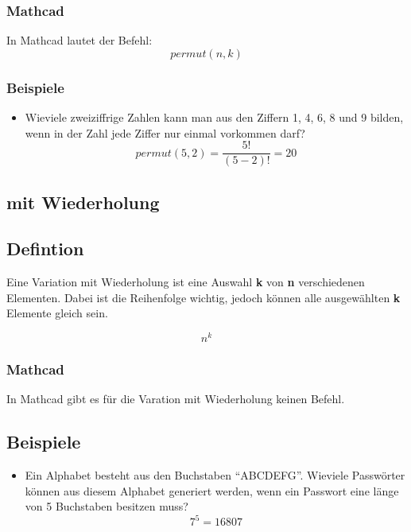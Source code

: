 \documentclass[a4paper,10pt]{article}
\begin{document}
\subsubsection{Mathcad}
In Mathcad lautet der Befehl:
\begin{equation}
  \label{eq:7}
  permut(n, k)
\end{equation}

\subsubsection{Beispiele}
\begin{itemize}
\item {
    Wieviele zweiziffrige Zahlen kann man aus den Ziffern 1, 4, 6, 8
    und 9 bilden, wenn in der Zahl jede Ziffer nur einmal vorkommen
    darf?
    \begin{equation}
      \label{eq:8}
      permut(5, 2) = \frac{5!}{(5 - 2)!} = 20
    \end{equation}
  }
\end{itemize}

\subsection{mit Wiederholung}
\subsection{Defintion}
Eine Variation mit Wiederholung ist eine Auswahl \textbf{k} von \textbf{n}
verschiedenen Elementen. Dabei ist die Reihenfolge wichtig, jedoch
können alle ausgewählten \textbf{k} Elemente gleich sein.

\begin{equation}
  \label{eq:11}
  n^k
\end{equation}

\subsubsection{Mathcad}
In Mathcad gibt es für die Varation mit Wiederholung keinen Befehl.

\subsection{Beispiele}
\begin{itemize}
\item {
    Ein Alphabet besteht aus den Buchstaben ``ABCDEFG''. Wieviele
    Passwörter können aus diesem Alphabet generiert werden, wenn ein
    Passwort eine länge von 5 Buchstaben besitzen muss?
    \begin{equation}
      \label{eq:12}
      7^5 = 16807
    \end{equation}
  }
\end{itemize}
\end{document}
